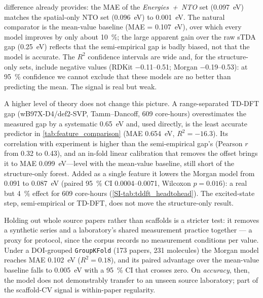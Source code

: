 difference already provides: the MAE of the \emph{Energies~+~NTO} set (\qty{0.097}{\electronvolt})
matches the spatial-only NTO set (\qty{0.096}{\electronvolt}) to \qty{0.001}{\electronvolt}.
The natural comparator is the mean-value baseline (MAE = \qty{0.107}{\electronvolt}),
over which every model improves by only about \qty{10}{\percent}; the large apparent
gain over the raw sTDA gap (\qty{0.25}{\electronvolt}) reflects that the semi-empirical
gap is badly biased, not that the model is accurate.
The $R^2$ confidence intervals are wide and, for the structure-only sets, include
negative values (RDKit \numrange{-0.11}{0.51}; Morgan \numrange{-0.19}{0.53}): at
\qty{95}{\percent} confidence we cannot exclude that these models are no better than
predicting the mean. The signal is real but weak.

A higher level of theory does not change this picture. A range-separated TD-DFT
gap (wB97X-D4/def2-SVP, Tamm--Dancoff, \num{609} core-hours) overestimates the
measured gap by a systematic \qty{0.65}{\electronvolt} and, used directly, is the
least accurate predictor in \cref{tab:feature_comparison} (MAE
\qty{0.654}{\electronvolt}, $R^2 = -16.3$). Its correlation with experiment is
higher than the semi-empirical gap's (Pearson $r$ from \num{0.32} to \num{0.43}),
and an in-fold linear calibration that removes the offset brings it to MAE
\qty{0.099}{\electronvolt}---level with the mean-value baseline, still short of
the structure-only forest. Added as a single feature it lowers the Morgan model
from \num{0.091} to \qty{0.087}{\electronvolt} (paired \qty{95}{\percent} CI
\numrange{0.0004}{0.0071}, Wilcoxon $p = 0.016$): a real but \qty{4}{\percent}
effect for \num{609} core-hours (\cref{SI-tab:tddft_headtohead}). The
excited-state step, semi-empirical or TD-DFT, does not move the structure-only
result.

Holding out whole source papers rather than scaffolds is a stricter test: it
removes a synthetic series and a laboratory's shared measurement practice together --- a
proxy for protocol, since the corpus records no measurement conditions per value. Under a
DOI-grouped \texttt{GroupKFold} (\num{173} papers, \num{231} molecules) the
Morgan model reaches MAE \qty{0.102}{\electronvolt} ($R^2 = 0.18$), and its
paired advantage over the mean-value baseline falls to \qty{0.005}{\electronvolt}
with a \qty{95}{\percent} CI that crosses zero. On \emph{accuracy}, then, the model
does not demonstrably transfer to an unseen source laboratory; part of the
scaffold-CV signal is within-paper regularity.

